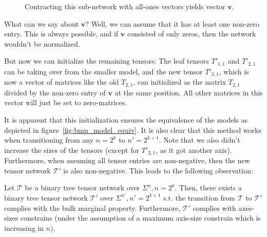 \documentclass[../../main.tex]{subfiles}
\begin{document}
    \begin{figure}[h]
        \centering
        \caption{Contracting this sub-network with all-ones vectors yields vector $\bm{v}$.}
        \label{fig:sufficient_condition_bmp}
    \end{figure}

    What can we say about $\bm{v}$? Well, we can assume that it has at least one non-zero entry. This is always possible, and if $\bm{v}$ consisted of only zeros, then the network wouldn't be normalized.

    But now we can initialize the remaining tensors: The leaf tensors $T'_{1,1}$ and $T'_{2,1}$ can be taking over from the smaller model, and the new tensor $T'_{2, 1}$, which is now a vector of matrices like the old $T_{2, 1}$, can initialized as the matrix $T_{2, 1}$ divided by the non-zero entry of $\bm{v}$ at the same position. All other matrices in this vector will just be set to zero-matrices.

    It is apparent that this initialization ensures the equivalence of the models as depicted in figure~\ref{fig:bmp_model_equiv}. It is also clear that this method works when transitioning from any $n = 2^k$ to $n' = 2^{k+1}$. Note that we also didn't increase the sizes of the tensors (except for $T'_{2, 1}$, as it got another axis). Furthermore, when assuming all tensor entries are non-negative, then the new tensor network $\mathcal{T}'$ is also non-negative. This leads to the following observation:

    \begin{corollary}
        Let $\mathcal{T}$ be a binary tree tensor network over $\Sigma^n, n = 2^k$. Then, there exists a binary tree tensor network $\mathcal{T}'$ over $\Sigma^{n'}, n' = 2^{k+1}$ s.t. the transition from $\mathcal{T}$ to $\mathcal{T}'$ complies with the bulk marginal property. Furthermore, $\mathcal{T}'$ complies with axes-sizes constrains (under the assumption of a maximum axis-size constrain which is increasing in $n$).
    \end{corollary}
\end{document}
